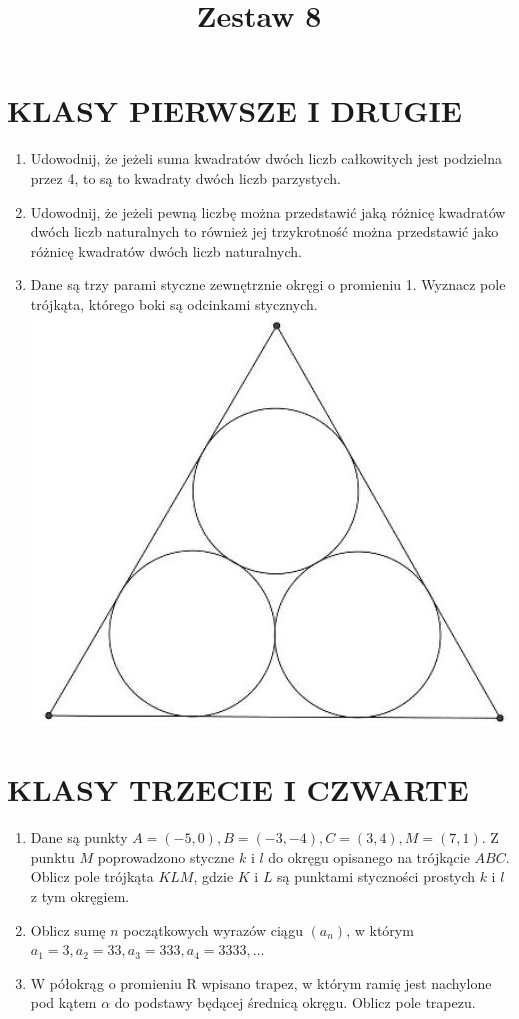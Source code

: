 \documentclass[10pt]{article}
\title{Zestaw 8 }
\author{}
\date{}
\begin{document}
\maketitle
\section*{KLASY PIERWSZE I DRUGIE}
\begin{enumerate}
  \item Udowodnij, że jeżeli suma kwadratów dwóch liczb całkowitych jest podzielna przez 4, to są to kwadraty dwóch liczb parzystych.
  \item Udowodnij, że jeżeli pewną liczbę można przedstawić jaką różnicę kwadratów dwóch liczb naturalnych to również jej trzykrotność można przedstawić jako różnicę kwadratów dwóch liczb naturalnych.
  \item Dane są trzy parami styczne zewnętrznie okręgi o promieniu 1. Wyznacz pole trójkąta, którego boki są odcinkami stycznych.\\
\includegraphics[max width=\textwidth, center]{2024_11_21_4f92067f3905c4fae6dfg-1}
\end{enumerate}

\section*{KLASY TRZECIE I CZWARTE}
\begin{enumerate}
  \item Dane są punkty \(A=(-5,0), B=(-3,-4), C=(3,4), M=(7,1)\). Z punktu \(M\) poprowadzono styczne \(k\) i \(l\) do okręgu opisanego na trójkącie \(A B C\). Oblicz pole trójkąta \(K L M\), gdzie \(K\) i \(L\) są punktami styczności prostych \(k\) i \(l\) z tym okręgiem.
  \item Oblicz sumę \(n\) początkowych wyrazów ciągu \(\left(a_{n}\right)\), w którym \(a_{1}=3, a_{2}=33, a_{3}=333, a_{4}=3333, \ldots\)
  \item W półokrąg o promieniu R wpisano trapez, w którym ramię jest nachylone pod kątem \(\alpha\) do podstawy będącej średnicą okręgu. Oblicz pole trapezu.
\end{enumerate}
\end{document}
